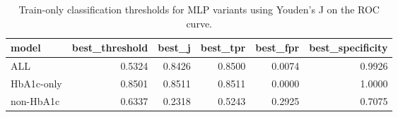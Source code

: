 \begin{table}[H]
\begin{center}
\begin{tabular}{lrrrrr}
\toprule
model & best_threshold & best_j & best_tpr & best_fpr & best_specificity \\
\midrule
ALL & 0.5324 & 0.8426 & 0.8500 & 0.0074 & 0.9926 \\
HbA1c-only & 0.8501 & 0.8511 & 0.8511 & 0.0000 & 1.0000 \\
non-HbA1c & 0.6337 & 0.2318 & 0.5243 & 0.2925 & 0.7075 \\
\bottomrule
\end{tabular}
\end{center}
\vspace{-5pt}
\caption{Train-only classification thresholds for MLP variants using Youden's J on the ROC curve.}
\label{tab:mlp_thresholds_youden_train}
\end{table}
